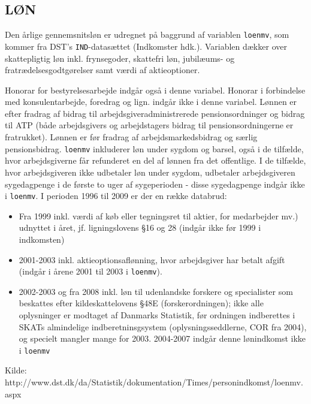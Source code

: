 \subsection{LØN \label{}}

Den årlige gennemsnitsløn er udregnet på baggrund af variablen \texttt{loenmv}, som kommer fra DST's \texttt{IND}-datasættet (Indkomster hdk.). Variablen dækker over skattepligtig løn inkl. frynsegoder, skattefri løn, jubilæums- og fratrædelsesgodtgørelser samt værdi af aktieoptioner. 

Honorar for bestyrelsesarbejde indgår også i denne variabel. Honorar i forbindelse med konsulentarbejde, foredrag og lign. indgår ikke i denne variabel. Lønnen er efter fradrag af bidrag til arbejdsgiveradministrerede pensionsordninger og bidrag til ATP (både arbejdsgivers og arbejdstagers bidrag til pensionsordningerne er fratrukket). Lønnen er før fradrag af arbejdsmarkedsbidrag og særlig pensionsbidrag. \texttt{loenmv} inkluderer løn under sygdom og barsel, også i de tilfælde, hvor arbejdsgiverne får refunderet en del af lønnen fra det offentlige. I de tilfælde, hvor arbejdsgiveren ikke udbetaler løn under sygdom, udbetaler arbejdsgiveren sygedagpenge i de første to uger af sygeperioden - disse sygedagpenge indgår ikke i \texttt{loenmv}.
% 
I perioden 1996 til 2009 er der en række databrud:
% 
\begin{itemize} [topsep=6pt,itemsep=-1ex]
  \item Fra 1999 inkl. værdi af køb eller tegningsret til aktier, for medarbejder mv.) udnyttet i året, jf. ligningslovens §16 og 28 (indgår ikke før 1999 i indkomsten)
  \item 2001-2003 inkl. aktieoptionsaflønning, hvor arbejdsgiver har betalt afgift (indgår i årene 2001 til 2003 i \texttt{loenmv}).
  \item 2002-2003 og fra 2008 inkl. løn til udenlandske forskere og specialister som beskattes efter kildeskattelovens §48E (forskerordningen); ikke alle oplysninger er modtaget af Danmarks Statistik, før ordningen indberettes i SKATs almindelige indberetninsgsystem (oplysningsseddlerne, COR fra 2004), og specielt mangler mange for 2003. 2004-2007 indgår denne lønindkomst ikke i \texttt{loenmv}
\end{itemize}
%
Kilde: http://www.dst.dk/da/Statistik/dokumentation/Times/personindkomst/loenmv.aspx


